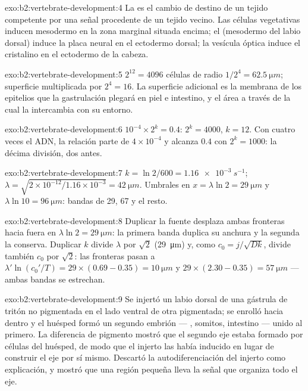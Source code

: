 \begin{solution}{exo:b2:vertebrate-development:4}
La  es el cambio de destino de un tejido competente por una señal
procedente de un tejido vecino. Las células vegetativas inducen mesodermo
en la zona marginal situada encima; el  (mesodermo del labio
dorsal) induce la placa neural en el ectodermo dorsal; la vesícula óptica
induce el cristalino en el ectodermo de la cabeza.
\end{solution}

\begin{solution}{exo:b2:vertebrate-development:5}
$2^{12} = 4096$ células de radio $1/2^{4} = \qty{62.5}{\micro m}$;
superficie multiplicada por $2^{4} = 16$. La superficie adicional es la
membrana de los epitelios que la gastrulación plegará en piel e
intestino, y el área a través de la cual la  intercambia con su
entorno.
\end{solution}

\begin{solution}{exo:b2:vertebrate-development:6}
$10^{-4}\times 2^{k} = 0.4$: $2^{k} = 4000$, $k = 12$. Con cuatro veces
el ADN, la relación parte de $4\times 10^{-4}$ y alcanza $0.4$
con $2^{k} = 1000$: la décima división, dos antes.
\end{solution}

\begin{solution}{exo:b2:vertebrate-development:7}
$k = \ln 2/600 = \qty{1.16e-3}{s^{-1}}$; $\lambda = \sqrt{2\times
10^{-12}/1.16\times 10^{-3}} = \qty{42}{\micro m}$. Umbrales en
$x = \lambda\ln 2 = \qty{29}{\micro m}$ y $\lambda\ln 10 =
\qty{96}{\micro m}$: bandas de 29, 67 y el resto.
\end{solution}

\begin{solution}{exo:b2:vertebrate-development:8}
Duplicar la fuente desplaza ambas fronteras hacia fuera en $\lambda\ln
2 = \qty{29}{\micro m}$: la primera banda duplica su anchura y la segunda
la conserva. Duplicar $k$ divide $\lambda$ por $\sqrt 2$
(\qty{29}{\micro m}) y, como $c_0 = j/\sqrt{Dk}$, divide también $c_0$ por
$\sqrt 2$: las fronteras pasan a $\lambda'\ln(c_0'/T) =
29\times(0.69 - 0.35) = \qty{10}{\micro m}$ y $29\times(2.30 -
0.35) = \qty{57}{\micro m}$ --- ambas bandas se estrechan.
\end{solution}

\begin{solution}{exo:b2:vertebrate-development:9}
Se injertó un labio dorsal de una gástrula de tritón no pigmentada en el
lado ventral de otra pigmentada; se enrolló hacia dentro y el huésped
formó un segundo embrión --- , somitos, intestino --- unido al
primero. La diferencia de pigmento mostró que el segundo eje estaba
formado por células del huésped, de modo que el injerto las había
inducido en lugar de construir el eje por sí mismo. Descartó la
autodiferenciación del injerto como explicación, y mostró que una región
pequeña lleva la señal que organiza todo el eje.
\end{solution}

